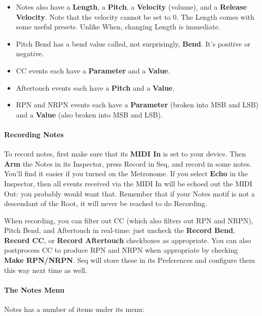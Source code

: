 \documentclass[twoside,10pt]{article}
\begin{document}
\begin{itemize}

\item Notes also have a {\bf Length}, a {\bf Pitch}, a {\bf Velocity} (volume), and a {\bf Release Velocity}.  Note that the velocity cannot be set to 0.  The Length comes with some useful presets.  Unlike When, changing Length is immediate.

\item Pitch Bend has a bend value called, not surprisingly, {\bf Bend}. It's positive or negative.

\item CC events each have a {\bf Parameter} and a {\bf Value}.

\item Aftertouch events each have a {\bf Pitch} and a {\bf Value}.

\item RPN and NRPN events  each have a {\bf Parameter} (broken into MSB and LSB) and a {\bf Value} (also broken into MSB and LSB).
\end{itemize}

\paragraph{Recording Notes} To record notes, first make sure that its {\bf MIDI In} is set to your device.  Then {\bf Arm} the Notes in its Inspector, press Record in Seq, and record in some notes.  You'll find it easier if you turned on the Metronome.  If you select {\bf Echo} in the Inspector, then all events received via the MIDI In will be echoed out the MIDI Out: you probably would want that.  Remember that if your Notes motif is not a descendant of the Root, it will never be reached to do Recording.

When recording, you can filter out CC (which also filters out RPN and NRPN), Pitch Bend, and Aftertouch in real-time: just uncheck the {\bf Record Bend}, {\bf Record CC}, or {\bf Record Aftertouch} checkboxes as appropriate.  You can also postprocess CC to produce RPN and NRPN when appropriate by checking {\bf Make RPN/NRPN}.  Seq will store these in its Preferences and configure them this way next time as well.

\paragraph{The Notes Menu} Notes has a number of items under its menu:
\end{document}
